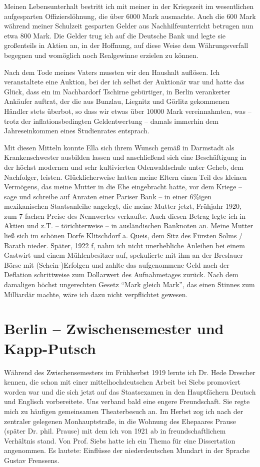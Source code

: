 \documentclass[a5paper,pagesize,10pt,twoside=true]{scrbook}
\renewcommand{\marginpar}[2][]{}
\begin{document}
Meinen Lebensunterhalt bestritt ich mit meiner in der Kriegszeit im wesentlichen aufgesparten Offizierslöhnung, die über \num{6000} Mark ausmachte. Auch die 600 Mark während meiner Schulzeit gesparten Gelder aus Nachhilfeunterricht betrugen nun etwa 800 Mark. Die Gelder trug ich auf die Deutsche Bank und legte sie großenteils in Aktien an, in der Hoffnung, auf diese Weise dem Währungsverfall begegnen und womöglich noch Realgewinne erzielen zu können.

Nach dem Tode meines Vaters mussten wir den Haushalt auflösen. Ich veranstaltete eine Auktion, bei der ich selbst der Auktionär war und hatte das Glück, dass ein im Nachbardorf Tschirne gebürtiger, in Berlin verankerter Ankäufer auftrat, der die aus Bunzlau, Liegnitz und Görlitz gekommenen Händler stets überbot, so dass wir etwas über \num{10000} Mark vereinnahmten, was -- trotz der inflationsbedingten Geldentwertung -- damals immerhin dem Jahreseinkommen eines Studienrates entsprach. 

Mit diesen Mitteln konnte Ella sich ihrem Wunsch gemäß in Darmstadt als Krankenschwester ausbilden lassen und anschließend sich eine Beschäftigung in der höchst modernen und sehr kultivierten Odenwaldschule unter Geheb, dem Nachfolger, leisten. Glücklicherweise hatten meine Eltern einen Teil des kleinen Vermögens, das meine Mutter in die Ehe eingebracht hatte, vor dem Kriege -- sage und schreibe auf Anraten einer Pariser Bank -- in einer 6\%igen mexikanischen Staatsanleihe angelegt, die meine Mutter jetzt, Frühjahr 1920, zum 7-fachen Preise des Nennwertes verkaufte. Auch diesen Betrag legte ich in Aktien und z.T. -- törichterweise -- in ausländischen Banknoten an. Meine Mutter ließ sich im schönen Dorfe Klitschdorf a. Queis, dem Sitz des Fürsten Solms / Barath nieder. Später, 1922 f, nahm ich nicht unerhebliche Anleihen bei einem Gastwirt und einem Mühlenbesitzer auf, spekulierte mit ihm an der Breslauer Börse mit (Schein-)Erfolgen und zahlte das aufgenommene Geld nach der Deflation schrittweise zum Dollarwert des Aufnahmetages zurück. Nach dem damaligen höchst ungerechten Gesetz \enquote{Mark gleich Mark}, das einen Stinnes zum Milliardär machte, wäre ich dazu nicht verpflichtet gewesen.

\section{Berlin -- Zwischensemester und Kapp-Putsch}
\marginpar{408}
Während des Zwischensemesters im Frühherbst 1919 lernte ich Dr. Hede Drescher kennen, die schon mit einer mittelhochdeutschen Arbeit bei Siebs promoviert worden war und die sich jetzt auf das Staatsexamen in den Hauptfächern Deutsch und Englisch vorbereitete. Uns verband bald eine engere Freundschaft. Sie regte mich zu häufigen gemeinsamen Theaterbesuch an. Im Herbst zog ich nach der zentraler gelegenen Monhauptstraße, in die Wohnung des Ehepaares Prause (später Dr. phil. Prause) mit dem ich von 1921 ab in freundschaftlichem Verhältnis stand. Von Prof. Siebs hatte ich ein Thema für eine Dissertation angenommen. Es lautete: Einflüsse der niederdeutschen Mundart in der Sprache Gustav Frenssens.
\end{document}
